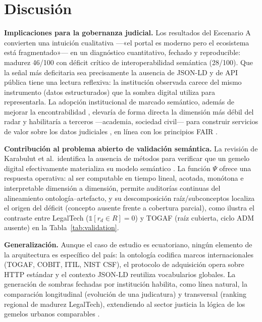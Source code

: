 \documentclass[computers,article,submit,pdftex,moreauthors]{Definitions/mdpi}
\begin{document}
\section{Discusión}
\label{sec:discussion}

\textbf{Implicaciones para la gobernanza judicial.} Los resultados del Escenario A convierten una intuición cualitativa —«el portal es moderno pero el ecosistema está fragmentado»— en un diagnóstico cuantitativo, fechado y reproducible: madurez 46/100 con déficit crítico de interoperabilidad semántica (28/100). Que la señal más deficitaria sea precisamente la ausencia de JSON-LD y de API pública tiene una lectura reflexiva: la institución observada carece del mismo instrumento (datos estructurados) que la sombra digital utiliza para representarla. La adopción institucional de marcado semántico, además de mejorar la encontrabilidad \cite{Guha2016}, elevaría de forma directa la dimensión más débil del radar y habilitaría a terceros —academia, sociedad civil— para construir servicios de valor sobre los datos judiciales \cite{Attard2015}, en línea con los principios FAIR \cite{Wilkinson2016}.

\textbf{Contribución al problema abierto de validación semántica.} La revisión de Karabulut et al.\ identifica la ausencia de métodos para verificar que un gemelo digital efectivamente materializa su modelo semántico \cite{Karabulut2024}. La función $\Psi$ ofrece una respuesta operativa: al ser computable en tiempo lineal, acotada, monótona e interpretable dimensión a dimensión, permite auditorías continuas del alineamiento ontología--artefacto, y su descomposición raíz/subconceptos localiza el origen del déficit (concepto ausente frente a cobertura parcial), como ilustra el contraste entre LegalTech ($\mathbb{1}[r_d \in R]=0$) y TOGAF (raíz cubierta, ciclo ADM ausente) en la Tabla~\ref{tab:validation}.

\textbf{Generalización.} Aunque el caso de estudio es ecuatoriano, ningún elemento de la arquitectura es específico del país: la ontología codifica marcos internacionales (TOGAF, COBIT, ITIL, NIST CSF), el protocolo de adquisición opera sobre HTTP estándar y el contexto JSON-LD reutiliza vocabularios globales. La generación de sombras fechadas por institución habilita, como línea natural, la comparación longitudinal (evolución de una judicatura) y transversal (ranking regional de madurez LegalTech), extendiendo al sector justicia la lógica de los gemelos urbanos comparables \cite{Shahat2021}.
\end{document}
